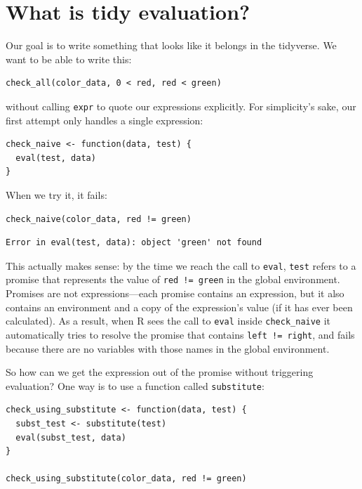 \section{What is tidy evaluation?}

Our goal is to write something that looks like it belongs in the tidyverse.
We want to be able to write this:

\begin{lstlisting}
check_all(color_data, 0 < red, red < green)
\end{lstlisting}

\noindent
without calling \texttt{expr} to quote our expressions explicitly.
For simplicity's sake,
our first attempt only handles a single expression:

\begin{lstlisting}
check_naive <- function(data, test) {
  eval(test, data)
}
\end{lstlisting}

\noindent
When we try it, it fails:

\begin{lstlisting}
check_naive(color_data, red != green)
\end{lstlisting}

\begin{lstlisting}
Error in eval(test, data): object 'green' not found
\end{lstlisting}

\noindent
This actually makes sense:
by the time we reach the call to \texttt{eval},
\texttt{test} refers to a promise that represents the value of \texttt{red != green} in the global environment.
Promises are not expressions---each promise contains an expression,
but it also contains an environment and a copy of the expression's value (if it has ever been calculated).
As a result,
when R sees the call to \texttt{eval} inside \texttt{check\_naive}
it automatically tries to resolve the promise that contains \texttt{left != right},
and fails because there are no variables with those names in the global environment.

So how can we get the expression out of the promise without triggering evaluation?
One way is to use a function called \texttt{substitute}:

\begin{lstlisting}
check_using_substitute <- function(data, test) {
  subst_test <- substitute(test)
  eval(subst_test, data)
}

check_using_substitute(color_data, red != green)
\end{lstlisting}

